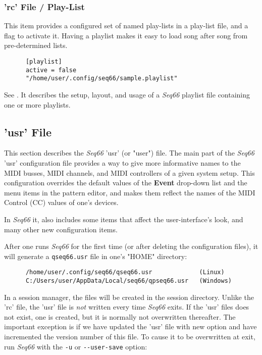 \subsubsection{'rc' File / Play-List}
\label{subsubsec:configuration_rc_playlist}

   This item provides a configured set of named play-lists in a play-list file,
   and a flag to activate it.
   Having a playlist makes it easy to load song after song from pre-determined
   lists.
   
   \index{[playlist]}
   \begin{verbatim}
      [playlist]
      active = false
      "/home/user/.config/seq66/sample.playlist"
   \end{verbatim}

   See .
   It describes the setup, layout, and usage of a
   \textsl{Seq66} playlist file containing one or more playlists.

\subsection{'usr' File}
\label{subsec:configuration_usr}

   This section describes the \textsl{Seq66} 'usr' (or "user") file.
   The main part of the \textsl{Seq66} 'usr'
   configuration file provides a way to give more
   informative names to the MIDI busses, MIDI channels, and MIDI controllers of
   a given system setup.
   This configuration overrides the default values
   of the \textbf{Event} drop-down list and the menu items in the pattern editor,
   and makes them reflect the names of the MIDI Control (CC) values of one's
   devices.

   In \textsl{Seq66} it, also includes some items that affect the
   user-interface's look, and many other new configuration items.

   After one runs \textsl{Seq66} for the first time (or after deleting
   the configuration files), it will generate a
   \texttt{qseq66.usr} file in one's "HOME" directory:

   \begin{verbatim}
      /home/user/.config/seq66/qseq66.usr             (Linux)
      C:/Users/user/AppData/Local/seq66/qpseq66.usr   (Windows)
   \end{verbatim}

   In a session manager, the files will be created in the session directory.
   Unlike the 'rc' file, the 'usr' file is \textsl{not} written every time
   \textsl{Seq66} exits.  If the 'usr' files does not exist, one is
   created, but it is normally not overwritten thereafter.
   The important exception is if we have updated the 'usr' file with new option
   and have incremented the version number of this file.
   To cause it to be overwritten at exit, run \textsl{Seq66} with the
   \texttt{-u} or \texttt{-{}-user-save} option:

